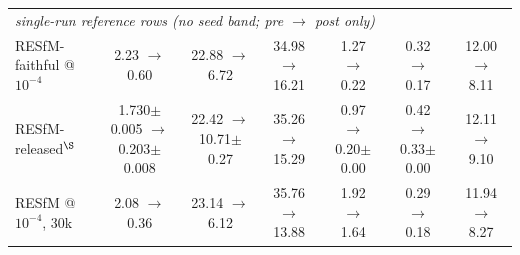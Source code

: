 \documentclass{article}
\begin{document}
\begin{table}[t]
{\begin{tabular}{lcccccc}
\midrule
\multicolumn{7}{l}{\emph{single-run reference rows (no seed band; pre $\to$ post only)}}\\[1pt]
RESfM-faithful @$10^{-4}$ & 2.23 $\to$ 0.60 & 22.88 $\to$ 6.72 & 34.98 $\to$ 16.21 & 1.27 $\to$ 0.22 & 0.32 $\to$ 0.17 & 12.00 $\to$ 8.11\\
RESfM-released$^{\S}$ & 1.730$\pm$0.005 $\to$ 0.203$\pm$0.008 & 22.42 $\to$ 10.71$\pm$0.27 & 35.26 $\to$ 15.29 & 0.97 $\to$ 0.20$\pm$0.00 & 0.42 $\to$ 0.33$\pm$0.00 & 12.11 $\to$ 9.10\\
RESfM @$10^{-4}$, 30k & 2.08 $\to$ 0.36 & 23.14 $\to$ 6.12 & 35.76 $\to$ 13.88 & 1.92 $\to$ 1.64 & 0.29 $\to$ 0.18 & 11.94 $\to$ 8.27\\
\bottomrule
\end{tabular}}%
\end{table}
\end{document}
